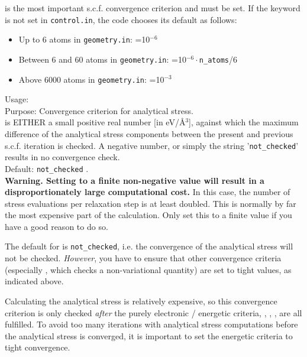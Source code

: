 is the most important s.c.f. convergence criterion and must be
set. If the keyword is not set in \texttt{control.in}, the code chooses
its default as follows:
\begin{itemize}
  \item Up to 6 atoms in \texttt{geometry.in}: =10$^{-6}$
  \item Between 6 and 60 atoms in \texttt{geometry.in}: =10$^{-6}\cdot$\texttt{n\_atoms}/6
  \item Above 6000 atoms in \texttt{geometry.in}: =10$^{-3}$
\end{itemize}

{
  \noindent
  Usage:   \\[1.0ex]
  Purpose: Convergence criterion for analytical stress. \\[1.0ex]
   is EITHER a small positive real number [in
    eV/{\AA$^3$}], against which the maximum difference of the
  analytical stress components between the present and previous
  s.c.f. iteration is checked. A negative number, or simply the string
  '\texttt{not\_checked}' results in no convergence check. \\[1.0ex]
  Default: \texttt{not\_checked} .\\
}
\textbf{Warning. Setting  to a finite
  non-negative value will result in a disproportionately large
  computational cost.} In this case, the number of stress evaluations
  per relaxation step is at least doubled. This is normally by far the
  most expensive part of the calculation. Only set this to a finite
  value if you have a good reason to do so.

The default for  is \texttt{not\_checked}, i.e. the convergence of
the analytical stress will not be checked. \emph{However}, you have to ensure
that other convergence criteria (especially ,
which checks a non-variational quantity) are set to tight values, as
indicated above.

Calculating the analytical stress is relatively expensive, so this convergence
criterion is only checked \emph{after} the purely electronic / energetic
criteria, , ,
, are all fulfilled. To avoid too many iterations
with analytical stress computations before the analytical stress is converged,
it is important to set the energetic criteria to tight convergence.

